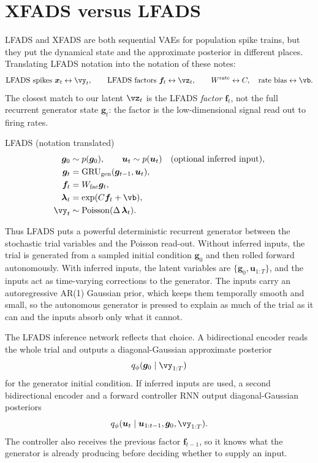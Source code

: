 \documentclass[11pt]{article}
\theoremstyle{plain}
\theoremstyle{definition}
\theoremstyle{remark}
\theoremstyle{definition}
\begin{document}
\section{XFADS versus LFADS}\label{sec:xfads-lfads}

LFADS \parencite{Pandarinath2018-lfads} and XFADS are both sequential VAEs for
population spike trains, but they put the dynamical state and the approximate
posterior in different places. Translating LFADS notation into the notation of
these notes:
\[
    \text{LFADS spikes } \bm{x}_t \leftrightarrow \vy_t,
    \qquad
    \text{LFADS factors } \bm{f}_t \leftrightarrow \vz_t,
    \qquad
    W^{\mathrm{rate}} \leftrightarrow C,\quad
    \text{rate bias} \leftrightarrow \vb .
\]
The closest match to our latent $\vz_t$ is the LFADS \emph{factor} $\bm f_t$,
not the full recurrent generator state $\bm g_t$: the factor is the
low-dimensional signal read out to firing rates.

\begin{genmodel}{LFADS (notation translated)}
\begin{align}
    \bm g_0 &\sim p(\bm g_0), \qquad
        \bm u_t \sim p(\bm u_t) \quad \text{(optional inferred input)}, \\
    \bm g_t &= \mathrm{GRU}_{\mathrm{gen}}(\bm g_{t-1}, \bm u_t), \\
    \bm f_t &= W_{\mathrm{fac}}\bm g_t, \\
    \bm{\lambda}_t &= \exp(C\bm f_t + \vb), \\
    \vy_t &\sim \mathrm{Poisson}(\Delta\,\bm{\lambda}_t) .
\end{align}
\end{genmodel}

Thus LFADS puts a powerful deterministic recurrent generator between the
stochastic trial variables and the Poisson read-out. Without inferred inputs, the
trial is generated from a sampled initial condition $\bm g_0$ and then rolled
forward autonomously. With inferred inputs, the latent variables are
$\{\bm g_0,\bm u_{1:T}\}$, and the inputs act as time-varying corrections
to the generator. The inputs carry an autoregressive AR(1) Gaussian prior, which
keeps them temporally smooth and small, so the autonomous generator is pressed to
explain as much of the trial as it can and the inputs absorb only what it cannot.

The LFADS inference network reflects that choice. A bidirectional encoder reads
the whole trial and outputs a diagonal-Gaussian approximate posterior
\[
    q_{\phi}(\bm g_0 \mid \vy_{1:T})
\]
for the generator initial condition. If inferred inputs are used, a second
bidirectional encoder and a forward controller RNN output diagonal-Gaussian
posteriors
\[
    q_{\phi}(\bm u_t \mid \bm u_{1:t-1}, \bm g_0, \vy_{1:T}) .
\]
The controller also receives the previous factor $\bm f_{t-1}$, so it knows
what the generator is already producing before deciding whether to supply an
input.
\end{document}
